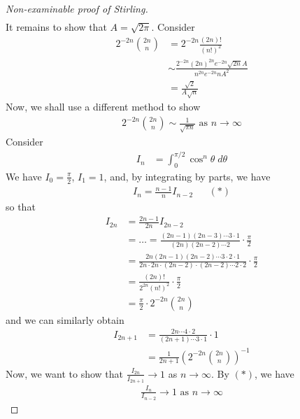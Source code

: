 \documentclass{../template/note}
\begin{document}
\begin{proof}[Non-examinable proof of Stirling]
\begin{align*}
        \end{align*}
        It remains to show that \(A = \sqrt{2\pi}\). Consider
        \begin{align*}
            2^{-2n}\binom{2n}{n} &= 2^{-2n} \frac{(2n)!}{(n!)^2} \\
            &\sim \frac{2^{-2n} (2n)^{2n} e^{-2n} \sqrt{2n} A}{n^{2n}e^{-2n}nA^2} \\
            &= \frac{\sqrt 2}{A \sqrt n}
        \end{align*}
        Now, we shall use a different method to show
        \begin{align*}
            2^{-2n} \binom{2n}{n} \sim \frac{1}{\sqrt{\pi n}} \text{ as }n \to \infty
        \end{align*}
        Consider
        \begin{align*}
            I_n &= \int_0^{\pi/2} \cos^n \theta \; d\theta
        \end{align*}
        We have \(I_0 = \frac{\pi}{2}\), \(I_1 = 1\), and, by integrating by parts, we have
        \begin{align*}
            I_n = \frac{n-1}{n} I_{n-2} && (*)
        \end{align*}
        so that
        \begin{align*}
            I_{2n} &= \frac{2n-1}{2n} I_{2n-2} \\
            &= \dots = \frac{(2n-1)(2n-3)\cdots 3 \cdot 1}{(2n)(2n-2) \cdots 2} \cdot \frac{\pi}{2} \\
            &= \frac{2n(2n-1)(2n-2) \cdots 3 \cdot 2 \cdot 1}{2n \cdot 2n \cdot (2n-2) \cdot (2n-2) \cdots 2 \cdot 2} \cdot \frac{\pi}{2} \\
            &= \frac{(2n)!}{2^{2n}(n!)^2} \cdot \frac{\pi}{2} \\
            &= \frac{\pi}{2} \cdot 2^{-2n} \binom{2n}{n}
        \end{align*}
        and we can similarly obtain
        \begin{align*}
            I_{2n+1} &= \frac{2n \cdots 4 \cdot 2}{(2n+1) \cdots 3 \cdot 1} \cdot 1 \\
            &= \frac{1}{2n+1} \left(2^{-2n} \binom{2n}{n}\right)^{-1}
        \end{align*}
        Now, we want to show that \(\frac{I_{2n}}{I_{2n+1}} \to 1\) as \(n \to \infty\). By \((*)\), we have
        \begin{align*}
            \frac{I_n}{I_{n-2}} \to 1 \text{ as } n \to \infty
        \end{align*}

\end{proof}
\end{document}
